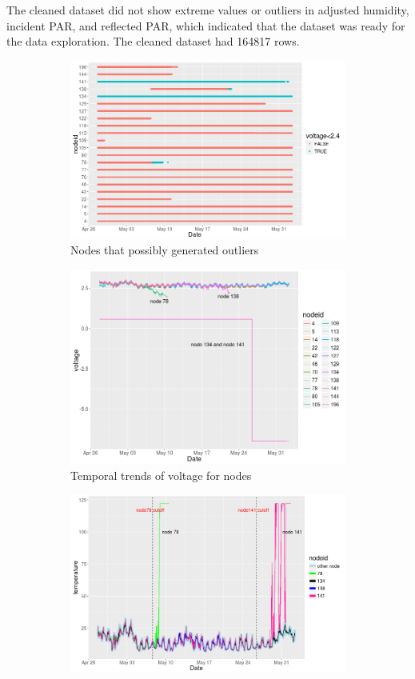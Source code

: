 \documentclass[11pt]{article}
\begin{document}
{The cleaned dataset did not show extreme values or outliers in adjusted humidity, incident PAR, and reflected PAR, which indicated that the dataset was ready for the data exploration. The cleaned dataset had 164817 rows.
\begin{figure}[H]
\centering
\begin{subfigure}{.5\textwidth}
\centering
\includegraphics[width=0.88\linewidth]{voltage_time.png}
\caption{Nodes that possibly generated outliers}
\label{fig:voltagetime}
\end{subfigure}%
\begin{subfigure}{.5\textwidth}
\centering
\includegraphics[width=0.88\linewidth]{strange_voltage.png}
\caption{Temporal trends of voltage for nodes}
\label{fig:strangevoltage}
\end{subfigure}
\begin{subfigure}{.5\textwidth}
\centering
\includegraphics[width=0.88\linewidth]{temp_few.png}

\end{subfigure}
\end{figure}}
\end{document}
